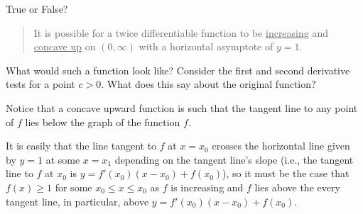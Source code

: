 \documentclass{ximera}
\author{Gregory Hartman \and Matthew Carr}
\begin{document}
\begin{exercise}




True or False? 
\begin{quote}
It is possible for a twice differentiable function to be \underline{increasing} and \underline{concave up} on $(0,\infty)$ with a horizontal asymptote of $y=1$.
\end{quote}

\begin{prompt}
\begin{multipleChoice}
\end{multipleChoice}
\end{prompt}

\begin{hint}
What would such a function look like? Consider the first and second derivative tests for a point $c>0$. What does this say about the original function?
\end{hint}
\begin{hint}
Notice that a concave upward function is such that the tangent line to any point of $f$ lies below the graph of the function $f$. 
\end{hint}
\begin{hint}
It is easily that the line tangent to $f$ at $x=x_0$ crosses the horizontal line given by $y=1$ at some $x=x_1$ depending on the tangent line's slope (i.e., the tangent line to $f$ at $x_0$ is $y=f'(x_0)(x-x_0)+f(x_0)$), so it must be the case that $f(x)\ge1$ for some $x_0\le x\le x_0$ as $f$ is increasing and $f$ lies above the every tangent line, in particular, above $y=f'(x_0)(x-x_0)+f(x_0)$.
\end{hint}
\end{exercise}
\end{document}
